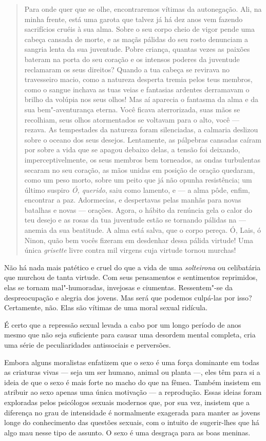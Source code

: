 \begin{quote}
Para onde quer que se olhe, encontraremos vítimas da autonegação. Ali,
na minha frente, está uma garota que talvez já há dez anos vem fazendo
sacrifícios cruéis à sua alma. Sobre o seu corpo cheio de vigor pende
uma cabeça cansada de morte, e as maçãs pálidas do seu rosto denunciam a
sangria lenta da sua juventude. Pobre criança, quantas vezes as paixões
bateram na porta do seu coração e os intensos poderes da juventude
reclamaram os seus direitos? Quando a tua cabeça se revirava no
travesseiro macio, como a natureza desperta tremia pelos teus membros,
como o sangue inchava as tuas veias e fantasias ardentes derramavam o
brilho da volúpia nos seus olhos! Mas aí aparecia o fantasma da alma e
da sua bem"-aventurança eterna. Você ficava aterrorizada, suas mãos se
recolhiam, seus olhos atormentados se voltavam para o alto, você --- rezava. As tempestades da natureza foram silenciadas, a calmaria
deslizou sobre o oceano dos seus desejos. Lentamente, as pálpebras
cansadas caíram por sobre a vida que se apagou debaixo delas, a tensão
foi deixando, imperceptivelmente, os seus membros bem torneados, as
ondas turbulentas secaram no seu coração, as mãos unidas em posição de
oração quedaram, como um peso morto, sobre um peito que já não opunha
resistência; um último suspiro \textit{Ó, querido}, saiu como lamento, e --- a
alma pôde, enfim, encontrar a paz. Adormecias, e despertavas pelas manhãs para
novas batalhas e novas --- orações. Agora, o hábito da renúncia gela o
calor do teu desejo e as rosas da tua juventude estão se tornando
pálidas na --- anemia da sua beatitude. A alma está salva, que o corpo
pereça. Ó, Lais, ó Ninon, quão bem vocês fizeram em desdenhar dessa
pálida virtude! Uma única \textit{grisette} livre contra mil virgens cuja
virtude tornou murchas!
\end{quote}

Não há nada mais patético e cruel do que a vida de uma \textit{solteirona} ou
celibatária que murchou de tanta virtude. Com seus pensamentos e
sentimentos reprimidos, elas se tornam mal"-humoradas, invejosas e
ciumentas. Ressentem"-se da despreocupação e alegria dos jovens. Mas será
que podemos culpá-las por isso? Certamente, não. Elas são vítimas de uma
moral sexual ridícula.

É certo que a repressão sexual levada a cabo por um longo período de
anos mesmo que não seja suficiente para causar uma desordem mental
completa, cria uma série de peculiaridades antissociais e perversões.

Embora alguns moralistas enfatizem que o sexo é uma força dominante em
todas as criaturas vivas --- seja um ser humano, animal ou planta ---,
eles têm para si a ideia de que o sexo é mais forte no macho do que na
fêmea. Também insistem em atribuir ao sexo apenas uma única motivação --- a reprodução. Essas ideias foram exploradas pelos psicólogos sexuais
modernos que, por sua vez, insistem que a diferença no grau de intensidade é
normalmente exagerada para manter as jovens longe do conhecimento das
questões sexuais, com o intuito de sugerir-lhes que há algo mau nesse tipo de assunto. O sexo é uma desgraça para as boas meninas.

